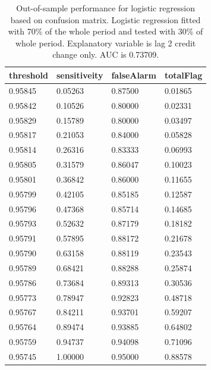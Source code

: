 \documentclass{article}
\begin{document}
\begin{multicols}{2}
\begin{table}[H]
        \caption{Out-of-sample performance for logistic regression based on confusion matrix.
        Logistic regression fitted with 70\% of the whole period and
        tested with 30\% of whole period. Explanatory variable is lag 2
        credit change only. AUC is 0.73709.}
        \begin{center}\begin{tabular}{|l|l|l|l|}
        \hline
         threshold         & sensitiveity        & falseAlarm         & totalFlag            \\ \hline
        0.95845 & 0.05263 & 0.87500              & 0.01865 \\ \hline
        0.95842 & 0.10526 & 0.80000                & 0.02331 \\ \hline
        0.95829 & 0.15789 & 0.80000                & 0.03497  \\ \hline
        0.95817 & 0.21053 & 0.84000               & 0.05828  \\ \hline
        0.95814 & 0.26316  & 0.83333 & 0.06993  \\ \hline
        0.95805 & 0.31579  & 0.86047 & 0.10023  \\ \hline
        0.95801 & 0.36842  & 0.86000               & 0.11655  \\ \hline
        0.95799 & 0.42105 & 0.85185 & 0.12587   \\ \hline
        0.95796 & 0.47368 & 0.85714 & 0.14685  \\ \hline
        0.95793 & 0.52632  & 0.87179 & 0.18182  \\ \hline
        0.95791 & 0.57895  & 0.88172 & 0.21678  \\ \hline
        0.95790 & 0.63158   & 0.88119 & 0.23543  \\ \hline
        0.95789 & 0.68421  & 0.88288 & 0.25874  \\ \hline
        0.95786 & 0.73684  & 0.89313 & 0.30536  \\ \hline
        0.95773 & 0.78947  & 0.92823 & 0.48718  \\ \hline
        0.95767 & 0.84211  & 0.93701  & 0.59207   \\ \hline
        0.95764   & 0.89474  & 0.93885 & 0.64802   \\ \hline
        0.95759 & 0.94737  & 0.94098  & 0.71096    \\ \hline
        0.95745 & 1.00000                 & 0.95000               & 0.88578   \\ \hline
        \end{tabular}\end{center}
\end{table}


\end{multicols}
\end{document}
